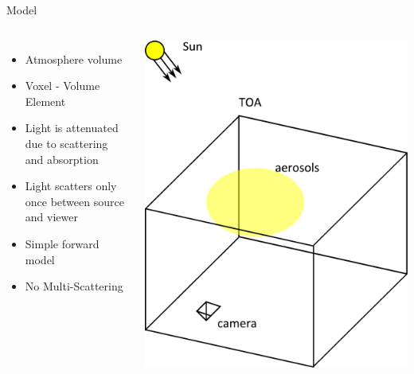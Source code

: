 \documentclass[compress,red,12pt]{beamer}
\begin{document}
\begin{frame}{Model}
  \begin{columns}[c]
    \begin{itemize}
    \item <1-2> Atmosphere volume
    \item <1-2> Voxel - Volume Element
    \item <3-4> Light is attenuated due to scattering and absorption
    \item <3-5> Light scatters only once between source and viewer
    \item <6> Simple forward model
    \item <6> No Multi-Scattering
    \end{itemize}
    \begin{overlayarea}{\columnwidth}{8cm}
       {\centerline{\includegraphics[width=\columnwidth]
          {images/atmo_settings3D1.pdf}}}

\end{overlayarea}
\end{columns}
\end{frame}
\end{document}
